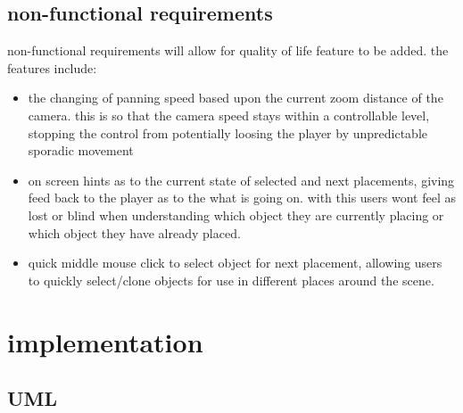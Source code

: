 \subsection{non-functional requirements}
non-functional requirements will allow for quality of life feature to be added. the features include:
\begin{itemize}
	\item the changing of panning speed based upon the current zoom distance of the camera. this is so that the camera speed stays within a controllable level, stopping the control from potentially loosing the player by unpredictable sporadic movement
	\item on screen hints as to the current state of selected and next placements, giving feed back to the player as to the what is going on. with this users wont feel as lost or blind when understanding which object they are currently placing or which object they have already placed.
	\item quick middle mouse click to select object for next placement, allowing users to quickly select/clone objects for use in different places around the scene.
\end{itemize}







\section{implementation}
\subsection{UML}
